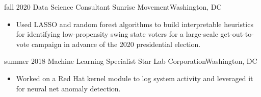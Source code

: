 \begin{cventries}
    \cventry
    {fall 2020}
    {Data Science Consultant}
    {Sunrise Movement}{Washington, DC}
    {\vspace{-4mm}\begin{itemize}[leftmargin=5mm]
          \item Used LASSO and random forest algorithms to build interpretable heuristics for identifying low-propensity swing state voters for a large-scale get-out-to-vote campaign in advance of the 2020 presidential election. 
     \end{itemize}}\vspace{-4mm}
     
     
    \cventry
    {summer 2018}
    {Machine Learning Specialist}
    {Star Lab Corporation}{Washington, DC}
    {\vspace{-4mm}\begin{itemize}[leftmargin=5mm]
          \item Worked on a Red Hat kernel module to log system activity and leveraged it for neural net anomaly detection.
     \end{itemize}}\vspace{-4mm}

\end{cventries}
